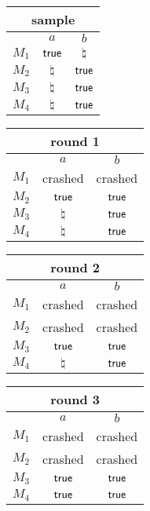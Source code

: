 \begin{tabular}{| c |c |c|}
\multicolumn{3}{c}{sample} \\
\hline
&$a$&$b$\\
\hline
$M_1$ & $\mathsf{true}$  & $\natural$\\
$M_2$ & $\natural$ & $\mathsf{true}$\\
$M_3$ & $\natural$ & $\mathsf{true}$ \\
$M_4$ & $\natural$ & $\mathsf{true}$ \\
\hline
\end{tabular}
\quad
\begin{tabular}{| c |c |c|}
\multicolumn{3}{c}{round 1} \\
\hline
&$a$&$b$\\
\hline
$M_1$ & crashed & crashed\\
$M_2$ & $\mathsf{true}$ & $\mathsf{true}$\\
$M_3$ & $\natural$ & $\mathsf{true}$ \\
$M_4$ & $\natural$ & $\mathsf{true}$ \\
\hline
\end{tabular}
\quad
\begin{tabular}{|c |c |c|}
\multicolumn{3}{c}{round 2} \\
\hline
&$a$&$b$\\
\hline
$M_1$ & crashed & crashed\\
$M_2$ & crashed & crashed\\
$M_3$ & $\mathsf{true}$ & $\mathsf{true}$ \\
$M_4$ & $\natural$ & $\mathsf{true}$ \\
\hline
\end{tabular}

\begin{tabular}{| c |c |c|}
\multicolumn{3}{c}{round 3} \\
\hline
&$a$&$b$\\
\hline
$M_1$ & crashed & crashed\\
$M_2$ & crashed & crashed\\
$M_3$ & $\mathsf{true}$ & $\mathsf{true}$  \\
$M_4$ & $\mathsf{true}$ & $\mathsf{true}$  \\
\hline
\end{tabular}   

\ \\

